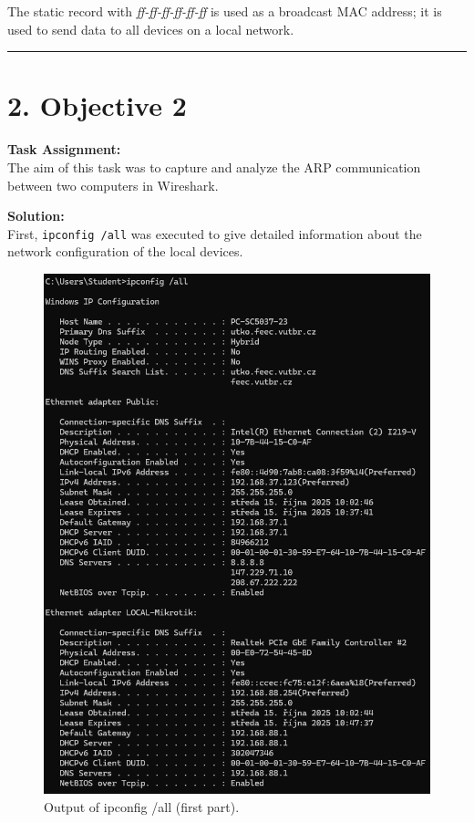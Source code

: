 \documentclass[a4paper,12pt]{article}
\begin{document}
The static record with \textit{ff-ff-ff-ff-ff-ff} is used as a broadcast MAC address; it is used to send data to all devices on a local network.
\vspace{1em}
\hrule
\vspace{0.5em}

\section*{2. Objective 2}

\textbf{Task Assignment:} \\
The aim of this task was to capture and analyze the ARP communication between two computers in Wireshark.

\vspace{0.5 em}
\textbf{Solution:} \\
First, \texttt{ipconfig /all} was executed to give detailed information about the network configuration of the local devices.
\begin{figure}[H]
\centering
\includegraphics[width=\linewidth, height=0.55\textheight, keepaspectratio]{Pictures_Lab1/objective 2p1.png}
\caption{Output of ipconfig /all (first part).}
\end{figure}
\end{document}
